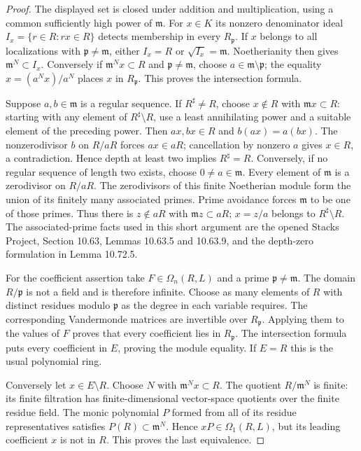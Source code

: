 \begin{proof}
The displayed set is closed under addition and multiplication,
using a common sufficiently high power of $\mathfrak m$.
For $x\in K$ its nonzero denominator ideal
$I_x=\{r\in R:rx\in R\}$ detects membership in every
$R_{\mathfrak p}$. If $x$ belongs to all localizations with
$\mathfrak p\ne\mathfrak m$, either $I_x=R$ or
$\sqrt{I_x}=\mathfrak m$. Noetherianity then gives
$\mathfrak m^N\subset I_x$. Conversely if
$\mathfrak m^Nx\subset R$ and $\mathfrak p\ne\mathfrak m$,
choose $a\in\mathfrak m\setminus\mathfrak p$; the equality
$x=(a^Nx)/a^N$ places $x$ in $R_{\mathfrak p}$.
This proves the intersection formula.

Suppose $a,b\in\mathfrak m$ is a regular sequence. If
$R^\sharp\ne R$, choose $x\notin R$ with
$\mathfrak m x\subset R$: starting with any element of
$R^\sharp\setminus R$, use a least annihilating power and a
suitable element of the preceding power. Then $ax,bx\in R$ and
$b(ax)=a(bx)$. The nonzerodivisor $b$ on $R/aR$ forces
$ax\in aR$; cancellation by nonzero $a$ gives $x\in R$,
a contradiction. Hence depth at least two implies $R^\sharp=R$.
Conversely, if no regular sequence of length two exists, choose
$0\ne a\in\mathfrak m$. Every element of $\mathfrak m$ is a
zerodivisor on $R/aR$. The zerodivisors of this finite Noetherian
module form the union of its finitely many associated primes.
Prime avoidance forces $\mathfrak m$ to be one of those primes.
Thus there is $z\notin aR$ with $\mathfrak m z\subset aR$;
$x=z/a$ belongs to $R^\sharp\setminus R$.
The associated-prime facts used in this short argument are the
opened Stacks Project, Section 10.63, Lemmas 10.63.5 and 10.63.9,
and the depth-zero formulation in Lemma 10.72.5.

For the coefficient assertion take $F\in\Omega_n(R,L)$ and a
prime $\mathfrak p\ne\mathfrak m$. The domain $R/\mathfrak p$
is not a field and is therefore infinite. Choose as many elements
of $R$ with distinct residues modulo $\mathfrak p$ as the degree
in each variable requires. The corresponding Vandermonde
matrices are invertible over $R_{\mathfrak p}$. Applying them
to the values of $F$ proves that every coefficient lies in
$R_{\mathfrak p}$. The intersection formula puts every coefficient
in $E$, proving the module equality. If $E=R$ this is the usual
polynomial ring.

Conversely let $x\in E\setminus R$. Choose $N$ with
$\mathfrak m^Nx\subset R$. The quotient $R/\mathfrak m^N$ is
finite: its finite filtration has finite-dimensional vector-space
quotients over the finite residue field. The monic polynomial
$P$ formed from all of its residue representatives satisfies
$P(R)\subset\mathfrak m^N$. Hence $xP\in\Omega_1(R,L)$, but
its leading coefficient $x$ is not in $R$. This proves the last
equivalence.
\end{proof}

